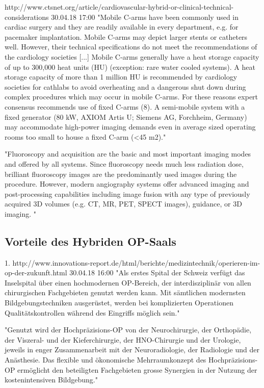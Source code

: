 	http://www.ctsnet.org/article/cardiovascular-hybrid-or-clinical-technical-considerations 30.04.18 17:00	
	"Mobile C-arms have been commonly used in cardiac surgery and they are readily available in every department, e.g. for pacemaker implantation. Mobile C-arms may depict larger stents or catheters well. However, their technical specifications do not meet the recommendations of the cardiology societies [...] 
	Mobile C-arms generally have a heat storage capacity of up to 300,000 heat units (HU) (exception: rare water cooled systems). A heat storage capacity of more than 1 million HU is recommended by cardiology societies for cathlabs to avoid overheating and a dangerous shut down during complex procedures which may occur in mobile C-arms. For these reasons expert consensus recommends use of fixed C-arms (8). A semi-mobile system with a fixed generator (80 kW, AXIOM Artis U; Siemens AG, Forchheim, Germany) may accommodate high-power imaging demands even in average sized operating rooms too small to house a fixed C-arm (<45 m2)."
	
	"Fluoroscopy and acquisition are the basic and most important imaging modes and offered by all systems. Since fluoroscopy needs much less radiation dose, brilliant fluoroscopy images are the predominantly used images during the procedure. However, modern angiography systems offer advanced imaging and post-processing capabilities including image fusion with any type of previously acquired 3D volumes (e.g. CT, MR, PET, SPECT images), guidance, or 3D imaging.  "
	
	
	

\subsection{Vorteile des Hybriden OP-Saals}
1. http://www.innovations-report.de/html/berichte/medizintechnik/operieren-im-op-der-zukunft.html 30.04.18 16:00
	"Als erstes Spital der Schweiz verfügt das Inselspital über einen hochmodernen OP-Bereich, der interdisziplinär von allen chirurgischen Fachgebieten genutzt werden kann. Mit sämtlichen modernsten Bildgebungstechniken ausgerüstet, werden bei komplizierten Operationen Qualitätskontrollen während des Eingriffs möglich sein."
	
	"Genutzt wird der Hochpräzisions-OP von der Neurochirurgie, der Orthopädie, der Viszeral- und der Kieferchirurgie, der HNO-Chirurgie und der Urologie, jeweils in enger Zusammenarbeit mit der Neuroradiologie, der Radiologie und der Anästhesie. Das flexible und ökonomische Mehrraumkonzept des Hochpräzisions-OP ermöglicht den beteiligten Fachgebieten grosse Synergien in der Nutzung der kostenintensiven Bildgebung."

